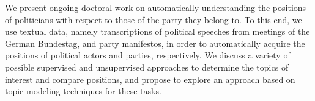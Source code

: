 We present ongoing doctoral work on automatically understanding the positions of politicians with respect to those of the party they belong to. To this end, we use textual data, namely transcriptions of political speeches from meetings of the German Bundestag, and party manifestos, in order to automatically acquire the positions of political actors and parties, respectively. We discuss a variety of possible supervised and unsupervised approaches to determine the topics of interest and compare positions, and propose to explore an approach based on topic modeling techniques for these tasks.
